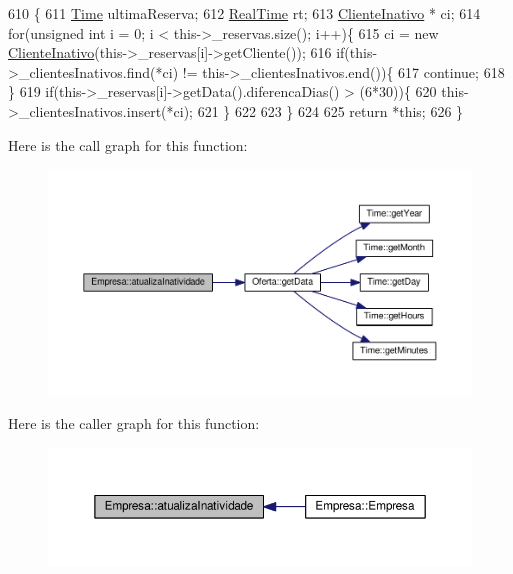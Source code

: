 \begin{DoxyCode}
610                                       \{
611     \hyperlink{classTime}{Time} ultimaReserva;
612     \hyperlink{classRealTime}{RealTime} rt;
613     \hyperlink{classClienteInativo}{ClienteInativo} * ci;
614     \textcolor{keywordflow}{for}(\textcolor{keywordtype}{unsigned} \textcolor{keywordtype}{int} i = 0; i < this->\_reservas.size(); i++)\{
615         ci = \textcolor{keyword}{new} \hyperlink{classClienteInativo}{ClienteInativo}(this->\_reservas[i]->getCliente());
616         \textcolor{keywordflow}{if}(this->\_clientesInativos.find(*ci) != this->\_clientesInativos.end())\{
617                 \textcolor{keywordflow}{continue};
618         \}
619         \textcolor{keywordflow}{if}(this->\_reservas[i]->getData().diferencaDias() > (6*30))\{
620             this->\_clientesInativos.insert(*ci);
621         \}
622 
623     \}
624 
625     \textcolor{keywordflow}{return} *\textcolor{keyword}{this};
626 \}
\end{DoxyCode}


Here is the call graph for this function\+:\nopagebreak
\begin{figure}[H]
\begin{center}
\leavevmode
\includegraphics[width=350pt]{classEmpresa_aea372dbf680408d9fb32341c03b3e5ad_cgraph}
\end{center}
\end{figure}




Here is the caller graph for this function\+:\nopagebreak
\begin{figure}[H]
\begin{center}
\leavevmode
\includegraphics[width=350pt]{classEmpresa_aea372dbf680408d9fb32341c03b3e5ad_icgraph}
\end{center}
\end{figure}


